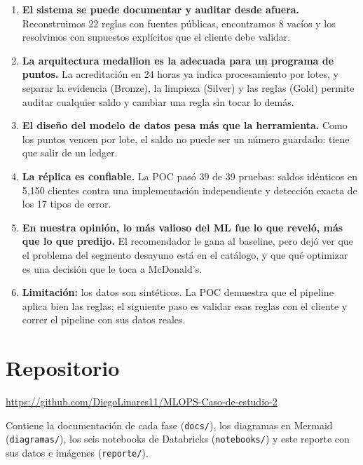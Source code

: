 \documentclass[12pt,a4paper]{article}
\begin{document}
\begin{enumerate}[leftmargin=1.4em]
\item \textbf{El sistema se puede documentar y auditar desde afuera.} Reconstruimos 22 reglas con
fuentes públicas, encontramos 8 vacíos y los resolvimos con supuestos explícitos que el cliente
debe validar.

\item \textbf{La arquitectura medallion es la adecuada para un programa de puntos.} La acreditación
en 24 horas ya indica procesamiento por lotes, y separar la evidencia (Bronze), la limpieza
(Silver) y las reglas (Gold) permite auditar cualquier saldo y cambiar una regla sin tocar lo
demás.

\item \textbf{El diseño del modelo de datos pesa más que la herramienta.} Como los puntos vencen
por lote, el saldo no puede ser un número guardado: tiene que salir de un ledger.

\item \textbf{La réplica es confiable.} La POC pasó 39 de 39 pruebas: saldos idénticos en 5,150
clientes contra una implementación independiente y detección exacta de los 17 tipos de error.

\item \textbf{En nuestra opinión, lo más valioso del ML fue lo que reveló, más que lo que predijo.}
El recomendador le gana al baseline, pero dejó ver que el problema del segmento desayuno está en
el catálogo, y que qué optimizar es una decisión que le toca a McDonald's.

\item \textbf{Limitación:} los datos son sintéticos. La POC demuestra que el pipeline aplica bien
las reglas; el siguiente paso es validar esas reglas con el cliente y correr el pipeline con sus
datos reales.
\end{enumerate}

\section{Repositorio}

\url{https://github.com/DiegoLinares11/MLOPS-Caso-de-estudio-2}

Contiene la documentación de cada fase (\texttt{docs/}), los diagramas en Mermaid
(\texttt{diagramas/}), los seis notebooks de Databricks (\texttt{notebooks/}) y este reporte con
sus datos e imágenes (\texttt{reporte/}).
\end{document}
